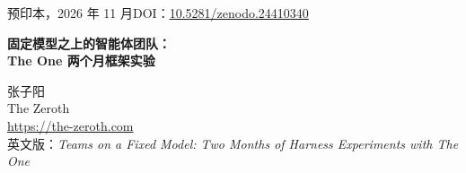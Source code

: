 \documentclass[UTF8,zihao=5,fontset=mac]{ctexart}
\begin{document}
\thispagestyle{plain}
\begin{center}
  {\small 预印本，2026 年 11 月\quad\textperiodcentered\quad DOI：\href{https://doi.org/10.5281/zenodo.24410340}{10.5281/zenodo.24410340}}\\[10pt]
  {\LARGE\bfseries 固定模型之上的智能体团队：\\[4pt] The One 两个月框架实验\par}
  \vspace{12pt}
  {\large 张子阳}\\[3pt]
  {\normalsize The Zeroth}\\[1pt]
  {\small\url{https://the-zeroth.com}}\\[6pt]
  {\footnotesize 英文版：\textit{Teams on a Fixed Model: Two Months of Harness Experiments with The One}}
\end{center}
\vspace{4pt}

\begin{abstract}
\noindent
模型固定时，一个智能体团队框架（harness）还能带来多少提升？本文报告 2026 年 9 月 28 日至
11 月 20 日共八周在 The One 上做的对照实验。The One 是一款在个人电脑上运行语言模型智能体团队的
产品。三个实验项目先后进行：V1 在我们自建的任务集上进行（120 多批）；V8 通过 Harbor 框架在
Terminal-Bench~4.0 上进行（315 个作业、6,223 次已评分试验，其中 30 道题留出、从未读过）；最后按
Artificial Analysis 的协议在 Terminal-Bench~4.1 上跑了一次。最终保留的配置是单个领队智能体，用
GPT-6.2 Sol、最高推理强度（max）。它在能运行的 63 道题上得分 60.9\%，把 3 道需要 GPU 的题记为失败时得分
58.1\%，与模型服务商自家的智能体（Codex）在同一模型、同一强度下持平，同时输入 token 少约 30\%，
按公开标价每次尝试 1.35 美元。本文有三个主要发现。第一，只追加的上下文把成本降低三分之一到一半，
准确率不变。第二，在单个上下文装得下的任务上，一个能力强的负责者不输于我们搭建的任何团队结构，
而同一模型给出的第二意见只会确认共同的误读，抓不住它。第三，模型在决策点上的选择只有在事实摆到它
面前时才会改变，建议从未改变它。多数在设计任务上胜出的手段到了留出任务上就失效了；本文介绍了发现
这些问题的留出纪律，并完整报告了负面结果。

\vspace{6pt}\noindent
\textbf{关键词：}大语言模型智能体；编程智能体；多智能体系统；智能体框架；上下文工程；
提示词缓存；Terminal-Bench；评估方法
\end{abstract}

















\clearpage
\appendix

\end{document}
